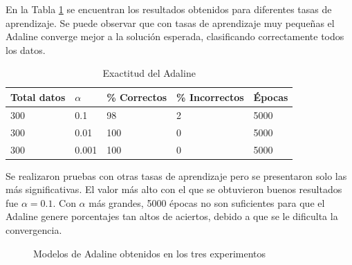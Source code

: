 \documentclass[a4paper]{article}
\begin{document}
		En la Tabla \ref{tabla:accAdaline} se encuentran los resultados obtenidos para diferentes tasas de aprendizaje.
		Se puede observar que con tasas de aprendizaje muy pequeñas el Adaline converge mejor a la solución esperada, clasificando correctamente todos los datos.
		\begin{table}[H]
		\begin{center}
		\begin{tabular}{|l|l|l|l|l|}
		\hline
		Total datos & $\alpha$ & \% Correctos & \% Incorrectos & Épocas\\
		\hline \hline
		300 & 0.1 & 98 & 2 & 5000\\ \hline
		300 & 0.01 & 100 & 0 & 5000\\ \hline
		300 & 0.001 & 100 & 0 & 5000\\ \hline
		\end{tabular}
		\caption{Exactitud del Adaline}
		\label{tabla:accAdaline}
		\end{center}
		\end{table}
		
		Se realizaron pruebas con otras tasas de aprendizaje pero se presentaron solo las más significativas. El valor más alto con el que se obtuvieron buenos resultados fue $\alpha=0.1$. Con $\alpha$ más grandes, 5000 épocas no son suficientes para que el Adaline genere porcentajes tan altos de aciertos, debido a que se le dificulta la convergencia.
		
		\begin{figure}[H]
		\centering
		\caption{Modelos de Adaline obtenidos en los tres experimentos}
		\label{f:adaline}
		\end{figure}
	
\end{document}
